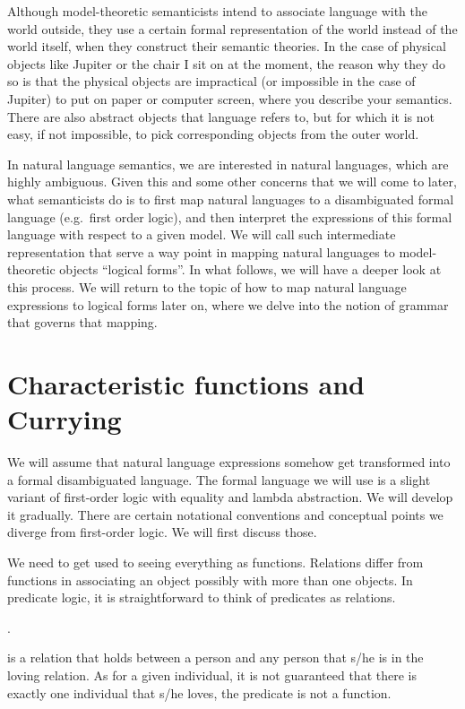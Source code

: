 \documentclass[11pt,a4paper,draft]{article}
\begin{document}
Although model-theoretic semanticists intend to associate language with the world outside, they use a certain formal representation of the world instead of the world itself, when they construct their semantic theories. In the case of physical objects like Jupiter or the chair I sit on at the moment, the reason why they do so is that the physical objects are impractical (or impossible in the case of Jupiter) to put on paper or computer screen, where you describe your semantics. There are also abstract objects that language refers to, but for which it is not easy, if not impossible, to pick corresponding objects from the outer world.

In natural language semantics, we are interested in natural languages, which are highly ambiguous. Given this and some other concerns that we will come to later, what semanticists do is to first map natural languages to a disambiguated formal language (e.g.\ first order logic), and then interpret the expressions of this formal language with respect to a given model. We will call such intermediate representation that serve a way point in mapping natural languages to model-theoretic objects ``logical forms''. In what follows, we will have a deeper look at this process. We will return to the topic of how to map natural language expressions to logical forms later on, where we delve into the notion of grammar that governs that mapping.

\section{Characteristic functions and Currying}

We will assume that natural language expressions somehow get transformed into a formal disambiguated language. The formal language we will use is a slight variant of first-order logic with equality and lambda abstraction. We will develop it gradually. There are certain notational conventions and conceptual points we diverge from first-order logic. We will first discuss those.   

We need to get used to seeing everything as functions. Relations differ from functions in associating an object possibly with more than one objects. In predicate logic, it is straightforward to think of predicates as relations. 

\ex.\label{johnmary}

is a relation that holds between a person and any person that s/he is in the loving relation. As for a given individual, it is not guaranteed that there is exactly one individual that s/he loves, the predicate  is not a function. 
\end{document}
